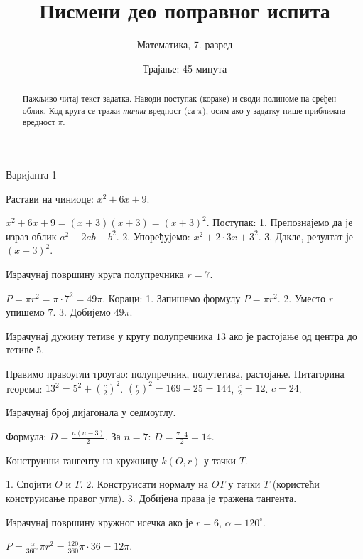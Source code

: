 \documentclass[11pt,a5paper,twoside,addpoints,noanswers]{exam}
\title{Писмени део поправног испита}
\author{Математика, 7. разред}
\date{Трајање: 45 минута}
\newcommand{\variant}[1]{#1}
\begin{document}
\maketitle

\ifprintanswers\else
\begin{flushleft}\scriptsize
\gradetable[h]
\end{flushleft}
\begin{abstract}\small
Пажљиво читај текст задатка. Наводи поступак (кораке) и своди полиноме на сређен облик.  
Код круга се тражи \emph{тачна} вредност (са $\pi$), осим ако у задатку пише приближна вредност $\pi$.
\end{abstract}
\fi

\ifprintanswers\else
\newpage
\fi

\variant{Варијанта 1}

\begin{questions}

\question[4] Растави на чиниоце: $x^2+6x+9$.
\begin{solution}[\stretch{2}]
$x^2+6x+9=(x+3)(x+3)=(x+3)^2$.  
Поступак:  
1. Препознајемо да је израз облик $a^2+2ab+b^2$.  
2. Упоређујемо: $x^2+2\cdot 3x+3^2$.  
3. Дакле, резултат је $(x+3)^2$.
\end{solution}

\question[3] Израчунај површину круга полупречника $r=7$.
\begin{solution}[\stretch{2}]
$P=\pi r^2=\pi\cdot 7^2=49\pi$.  
Кораци:  
1. Запишемо формулу $P=\pi r^2$.  
2. Уместо $r$ упишемо $7$.  
3. Добијемо $49\pi$.
\end{solution}

\question[4] Израчунај дужину тетиве у кругу полупречника $13$ ако је растојање од центра до тетиве $5$.
\begin{solution}[\stretch{3}]
Правимо правоугли троугао: полупречник, полутетива, растојање.  
Питагорина теорема: $13^2=5^2+(\tfrac{c}{2})^2$.  
$(\tfrac{c}{2})^2=169-25=144$, $\tfrac{c}{2}=12$.  
$c=24$.  
\end{solution}

\question[3] Израчунај број дијагонала у седмоуглу.
\begin{solution}[\stretch{2}]
Формула: $D=\tfrac{n(n-3)}2$.  
За $n=7$: $D=\tfrac{7\cdot 4}2=14$.  
\end{solution}

\question[4] Конструиши тангенту на кружницу $k(O,r)$ у тачки $T$.
\begin{solution}[\stretch{4}]
1. Спојити $O$ и $T$.  
2. Конструисати нормалу на $OT$ у тачки $T$ (користећи конструисање правог угла).  
3. Добијена права је тражена тангента.  
\end{solution}

\question[4] Израчунај површину кружног исечка ако је $r=6$, $\alpha=120^\circ$.
\begin{solution}[\stretch{3}]
$P=\frac{\alpha}{360^\circ}\pi r^2=\frac{120}{360}\pi\cdot 36=12\pi$.  
\end{solution}

\end{questions}
\end{document}
